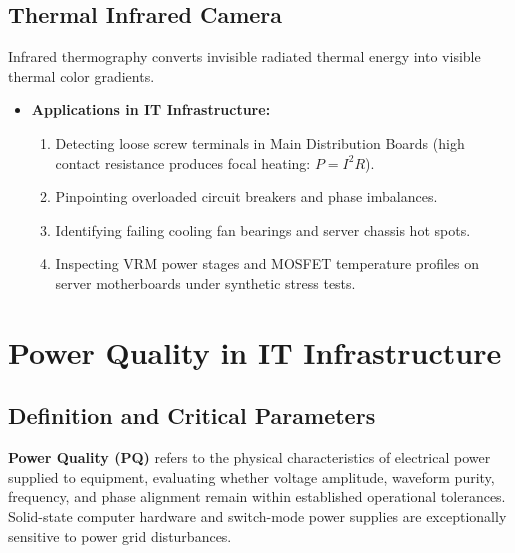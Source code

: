 \subsection{Thermal Infrared Camera}
Infrared thermography converts invisible radiated thermal energy into visible thermal color gradients.
\begin{itemize}[leftmargin=*]
    \item \textbf{Applications in IT Infrastructure:}
    \begin{enumerate}
        \item Detecting loose screw terminals in Main Distribution Boards (high contact resistance produces focal heating: $P = I^2 R$).
        \item Pinpointing overloaded circuit breakers and phase imbalances.
        \item Identifying failing cooling fan bearings and server chassis hot spots.
        \item Inspecting VRM power stages and MOSFET temperature profiles on server motherboards under synthetic stress tests.
    \end{enumerate}
\end{itemize}

\section{Power Quality in IT Infrastructure}

\subsection{Definition and Critical Parameters}
\textbf{Power Quality (PQ)} refers to the physical characteristics of electrical power supplied to equipment, evaluating whether voltage amplitude, waveform purity, frequency, and phase alignment remain within established operational tolerances. Solid-state computer hardware and switch-mode power supplies are exceptionally sensitive to power grid disturbances.

